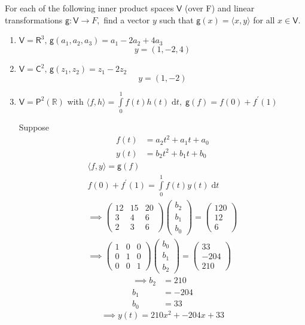 For each of the following inner product spaces $\mathsf{V}$ (over F)
and linear transformations $\mathsf{g}\colon \mathsf{V} \to F,$ find a
vector $y$ such that $\mathsf{g}(x) = \langle x,y\rangle$ for all $x
\in \mathsf{V}.$
\begin{enumerate}
\item $\mathsf{V} = \mathsf{R}^3,\, \mathsf{g}(a_1,a_2,a_3) =
  a_1-2a_2+4a_3$
\begin{equation}
y = (1,-2,4)
\end{equation}
\item $\mathsf{V} = \mathsf{C}^2,\,\mathsf{g}(z_1,z_2) = z_1-2z_2$
\begin{equation}
y = (1,-2)
\end{equation}
\item $\mathsf{V}=\mathsf{P}^2(\mathbb{R})$ with $\langle f,h\rangle
  =\int\limits_0^1 f(t)h(t)\; \mathrm{d}t,\; \mathsf{g}(f) =
  f(0)+f^\prime(1)$

Suppose 
\begin{align}
f(t) &= a_2t^2 + a_1t + a_0\\
y(t) &= b_2t^2 + b_1t + b_0
\end{align}
\begin{gather}
\langle f,y \rangle = \mathsf{g}(f)\\
f(0) + f^\prime(1) = \int\limits_0^1 f(t)y(t)\; \mathrm{d}t\\
\implies \begin{pmatrix}
12 & 15 & 20\\
3 & 4 & 6\\
2 & 3 & 6
\end{pmatrix}
\begin{pmatrix}
b_2 \\ b_1\\b_0
\end{pmatrix}
=
\begin{pmatrix}
120\\
12\\
6
\end{pmatrix}\\
\implies \begin{pmatrix}
1 & 0 & 0\\
0 & 1 & 0\\
0 & 0 & 1
\end{pmatrix}
\begin{pmatrix}
b_0\\b_1\\b_2
\end{pmatrix}
=\begin{pmatrix}
33 \\ -204\\ 210
\end{pmatrix}
\end{gather}
\begin{align}
\implies b_2 &= 210\\
b_1 &= -204\\
b_0 &= 33
\end{align}
\begin{equation}
\implies y(t) = 210x^2 + -204x + 33
\end{equation}
\end{enumerate}
